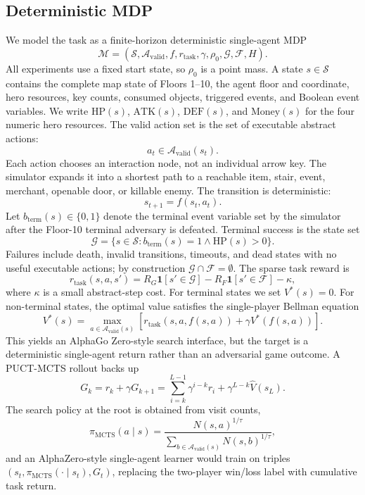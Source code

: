 \documentclass{article}
\begin{document}
\subsection{Deterministic MDP}
We model the task as a finite-horizon deterministic single-agent MDP
\[
  \mathcal M=
  (\mathcal S,\mathcal A_{\mathrm{valid}},f,r_{\mathrm{task}},
  \gamma,\rho_0,\mathcal G,\mathcal F,H).
\]
All experiments use a fixed start state, so \(\rho_0\) is a point mass.  A state
\(s\in\mathcal S\) contains the complete map state of Floors 1--10, the
agent floor and coordinate, hero resources, key counts, consumed objects,
triggered events, and Boolean event variables.  We write
\(\mathrm{HP}(s)\), \(\mathrm{ATK}(s)\), \(\mathrm{DEF}(s)\), and
\(\mathrm{Money}(s)\) for the four numeric hero resources.  The valid
action set is the set of executable abstract actions:
\[
  a_t \in \mathcal A_{\mathrm{valid}}(s_t).
\]
Each action chooses an interaction node, not an individual arrow key.  The
simulator expands it into a shortest path to a reachable item, stair, event,
merchant, openable door, or killable enemy.  The transition is deterministic:
\[
  s_{t+1}=f(s_t,a_t).
\]
Let \(b_{\mathrm{term}}(s)\in\{0,1\}\) denote the terminal event variable set by
the simulator after the Floor-10 terminal adversary is defeated.  Terminal
success is the state set
\[
  \mathcal G=\{s\in\mathcal S:b_{\mathrm{term}}(s)=1
  \land \mathrm{HP}(s)>0\}.
\]
Failures include death, invalid transitions, timeouts, and dead states with no
useful executable actions; by construction \(\mathcal G\cap\mathcal F=\emptyset\).
The sparse task reward is
\[
  r_{\mathrm{task}}(s,a,s') =
  R_G\mathbf 1[s'\in\mathcal G]
  -R_F\mathbf 1[s'\in\mathcal F]
  -\kappa,
\]
where \(\kappa\) is a small abstract-step cost.  For terminal states we set
\(V^*(s)=0\).  For non-terminal states, the optimal value satisfies the
single-player Bellman equation
\[
  V^*(s)=
  \max_{a\in\mathcal A_{\mathrm{valid}}(s)}
  \left[r_{\mathrm{task}}(s,a,f(s,a))+\gamma V^*(f(s,a))\right].
\]
This yields an AlphaGo Zero-style search interface, but the target is a
deterministic single-agent return rather than an adversarial game outcome.  A
PUCT-MCTS rollout backs up
\[
  G_k = r_k+\gamma G_{k+1}
      = \sum_{i=k}^{L-1}\gamma^{i-k}r_i+\gamma^{L-k}\hat V(s_L).
\]
The search policy at the root is obtained from visit counts,
\[
  \pi_{\mathrm{MCTS}}(a\mid s)
  =
  \frac{N(s,a)^{1/\tau}}
  {\sum_{b\in\mathcal A_{\mathrm{valid}}(s)} N(s,b)^{1/\tau}},
\]
and an AlphaZero-style single-agent learner would train on triples
\((s_t,\pi_{\mathrm{MCTS}}(\cdot\mid s_t),G_t)\), replacing the two-player
win/loss label with cumulative task return.
\end{document}
